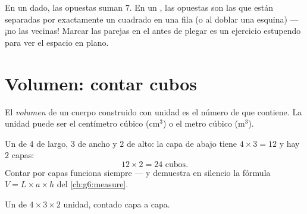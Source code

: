 \begin{example}\label{ex:g5:solids:read}
En un dado, las  opuestas suman $7$. En un , las  opuestas son
las que están separadas por exactamente un cuadrado en una fila (o al doblar una
esquina) --- ¡no las vecinas! Marcar las parejas en el  antes de
plegar es un ejercicio estupendo para ver el espacio en plano.
\end{example}

\section{Volumen: contar cubos}

\begin{definition}\label{def:g5:solids:volume}
El \emph{volumen} de un cuerpo construido con  unidad es
el número de  que contiene. La unidad puede ser el centímetro cúbico
(cm$^3$) o el metro cúbico (m$^3$).
\end{definition}

\begin{example}\label{ex:g5:solids:layers}
Un  de $4$  de largo, $3$ de ancho y $2$ de alto: la capa de abajo tiene
$4 \times 3 = 12$  y hay $2$ capas:
\[
12 \times 2 = 24 \text{ cubos} .
\]
Contar por capas funciona siempre --- y demuestra en silencio la
fórmula $V = L \times a \times h$ del \cref{ch:g6:measure}.
\end{example}

\begin{omfigure}

{\small Un  de $4 \times 3 \times 2$  unidad, contado capa a
capa.}
\end{omfigure}

